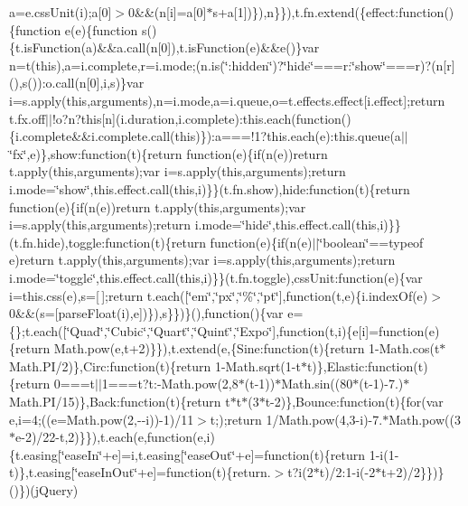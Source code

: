 \begin{DoxyCompactItemize}
a=e.\+css\+Unit(i);a\mbox{[}0\mbox{]}$>$0\&\&(n\mbox{[}i\mbox{]}=a\mbox{[}0\mbox{]}$\ast$s+a\mbox{[}1\mbox{]})\}),n\}\}),t.\+fn.\+extend(\{effect\+:function()\{function e(e)\{function s()\{t.\+is\+Function(a)\&\&a.\+call(n\mbox{[}0\mbox{]}),t.\+is\+Function(e)\&\&e()\}var n=t(this),a=i.\+complete,r=i.\+mode;(n.\+is(\char`\"{}\+:hidden\char`\"{})?\char`\"{}hide\char`\"{}===r\+:\char`\"{}show\char`\"{}===r)?(n\mbox{[}r\mbox{]}(),s())\+:o.\+call(n\mbox{[}0\mbox{]},i,s)\}var i=s.\+apply(this,arguments),n=i.\+mode,a=i.\+queue,o=t.\+effects.\+effect\mbox{[}i.\+effect\mbox{]};return t.\+fx.\+off$\vert$$\vert$!o?n?this\mbox{[}n\mbox{]}(i.\+duration,i.\+complete)\+:this.\+each(function()\{i.\+complete\&\&i.\+complete.\+call(this)\})\+:a===!1?this.\+each(e)\+:this.\+queue(a$\vert$$\vert$\char`\"{}fx\char`\"{},e)\},show\+:function(t)\{return function(e)\{if(n(e))return t.\+apply(this,arguments);var i=s.\+apply(this,arguments);return i.\+mode=\char`\"{}show\char`\"{},this.\+effect.\+call(this,i)\}\}(t.\+fn.\+show),hide\+:function(t)\{return function(e)\{if(n(e))return t.\+apply(this,arguments);var i=s.\+apply(this,arguments);return i.\+mode=\char`\"{}hide\char`\"{},this.\+effect.\+call(this,i)\}\}(t.\+fn.\+hide),toggle\+:function(t)\{return function(e)\{if(n(e)$\vert$$\vert$\char`\"{}boolean\char`\"{}==typeof e)return t.\+apply(this,arguments);var i=s.\+apply(this,arguments);return i.\+mode=\char`\"{}toggle\char`\"{},this.\+effect.\+call(this,i)\}\}(t.\+fn.\+toggle),css\+Unit\+:function(e)\{var i=this.\+css(e),s=\mbox{[}$\,$\mbox{]};return t.\+each(\mbox{[}\char`\"{}em\char`\"{},\char`\"{}px\char`\"{},\char`\"{}\%\char`\"{},\char`\"{}pt\char`\"{}\mbox{]},function(t,e)\{i.\+index\+Of(e)$>$0\&\&(s=\mbox{[}parse\+Float(i),e\mbox{]})\}),s\}\})\}(),function()\{var e=\{\};t.\+each(\mbox{[}\char`\"{}\+Quad\char`\"{},\char`\"{}\+Cubic\char`\"{},\char`\"{}\+Quart\char`\"{},\char`\"{}\+Quint\char`\"{},\char`\"{}\+Expo\char`\"{}\mbox{]},function(t,i)\{e\mbox{[}i\mbox{]}=function(e)\{return Math.\+pow(e,t+2)\}\}),t.\+extend(e,\{\+Sine\+:function(t)\{return 1-\/\+Math.\+cos(t$\ast$\+Math.\+P\+I/2)\},\+Circ\+:function(t)\{return 1-\/\+Math.\+sqrt(1-\/t$\ast$t)\},\+Elastic\+:function(t)\{return 0===t$\vert$$\vert$1===t?t\+:-\/\+Math.\+pow(2,8$\ast$(t-\/1))$\ast$\+Math.\+sin((80$\ast$(t-\/1)-\/7.)$\ast$\+Math.\+P\+I/15)\},\+Back\+:function(t)\{return t$\ast$t$\ast$(3$\ast$t-\/2)\},\+Bounce\+:function(t)\{for(var e,i=4;((e=\+Math.\+pow(2,-\/-\/i))-\/1)/11$>$t;);return 1/\+Math.\+pow(4,3-\/i)-\/7.$\ast$\+Math.\+pow((3$\ast$e-\/2)/22-\/t,2)\}\}),t.\+each(e,function(e,i)\{t.\+easing\mbox{[}\char`\"{}ease\+In\char`\"{}+e\mbox{]}=i,t.\+easing\mbox{[}\char`\"{}ease\+Out\char`\"{}+e\mbox{]}=function(t)\{return 1-\/i(1-\/t)\},t.\+easing\mbox{[}\char`\"{}ease\+In\+Out\char`\"{}+e\mbox{]}=function(t)\{return.$>$t?i(2$\ast$t)/2\+:1-\/i(-\/2$\ast$t+2)/2\}\})\}()\})(j\+Query)

\end{DoxyCompactItemize}
